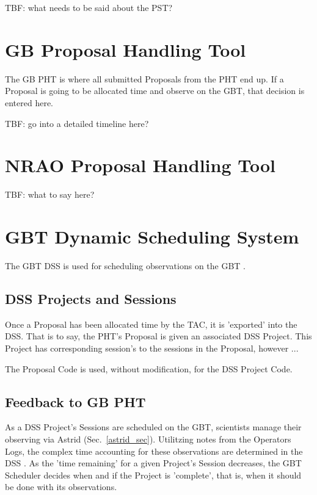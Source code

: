 \documentclass{article}
\begin{document}
TBF: what needs to be said about the PST?  

\section{GB Proposal Handling Tool}\label{gb_pht_sec}

The GB PHT is where all submitted Proposals from the PHT end up.  If a
Proposal is going to be allocated time and observe on the GBT, that decision
is entered here.

TBF: go into a detailed timeline here?


\section{NRAO Proposal Handling Tool}\label{nrao_pht_sec}

TBF: what to say here?


\section{GBT Dynamic Scheduling System}\label{dss_sec}

The GBT DSS is used for scheduling observations on the GBT \cite{}.

\subsection{DSS Projects and Sessions}

Once a Proposal has been allocated time by the TAC, it is 'exported' into the
DSS.  That is to say, the PHT's Proposal is given an associated DSS Project.
This Project has corresponding session's to the sessions in the Proposal,
however ...

The Proposal Code is used, without modification, for the DSS Project Code.

\subsection{Feedback to GB PHT}

As a DSS Project's Sessions are scheduled on the GBT, scientists manage their observing via Astrid (Sec.~\ref{astrid_sec}).  Utilitzing notes from the Operators Logs, the complex time accounting for these observations are determined in the DSS \cite{}.  As the 'time remaining' for a given Project's Session decreases, the GBT Scheduler decides when and if the Project is 'complete', that is, when it should be done with its observations.
\end{document}
